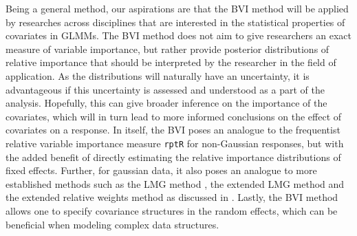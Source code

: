 Being a general method, our aspirations are that the BVI method will be applied by researches across disciplines that are interested in the statistical properties of covariates in GLMMs. The BVI method does not aim to give researchers an exact measure of variable importance, but rather provide posterior distributions of relative importance that should be interpreted by the researcher in the field of application. As the distributions will naturally have an uncertainty, it is advantageous if this uncertainty is assessed and understood as a part of the analysis. Hopefully, this can give broader inference on the importance of the covariates, which will in turn lead to more informed conclusions on the effect of covariates on a response. In itself, the BVI poses an analogue to the frequentist relative variable importance measure \texttt{rptR} for non-Gaussian responses, but with the added benefit of directly estimating the relative importance distributions of fixed effects. Further, for gaussian data, it also poses an analogue to more established methods such as the LMG method \citep{gromping_relaimpo}, the extended LMG method \citep{matre} and the extended relative weights method \citep{matre} as discussed in \citet{Arnstad:Relative_variable_importance_in_Bayesian_linear_mixed_models:2024}. Lastly, the BVI method allows one to specify covariance structures in the random effects, which can be beneficial when modeling complex data structures.
\\
\\
